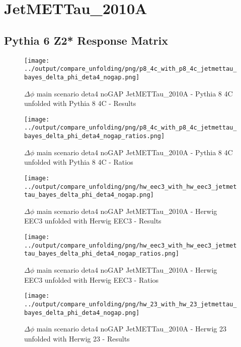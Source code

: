 \documentclass[11pt]{book}
\begin{document}
\section{JetMETTau\_2010A}
\subsection{Pythia 6 Z2* Response Matrix}


\begin{figure}[ht]
\centering
\texttt{[image: ../output/compare\_unfolding/png/p8\_4c\_with\_p8\_4c\_jetmettau\_bayes\_delta\_phi\_deta4\_nogap.png]}
\caption{$\Delta\phi$ main scenario deta4 noGAP JetMETTau\_2010A - Pythia 8 4C unfolded with Pythia 8 4C - Results}
\label{p8_p8_jetmettau_bayes_delta_phi_deta4_nogap_a}
\end{figure}

\begin{figure}[ht]
\centering
\texttt{[image: ../output/compare\_unfolding/png/p8\_4c\_with\_p8\_4c\_jetmettau\_bayes\_delta\_phi\_deta4\_nogap\_ratios.png]}
\caption{$\Delta\phi$ main scenario deta4 noGAP JetMETTau\_2010A - Pythia 8 4C unfolded with Pythia 8 4C - Ratios}
\label{p8_p8_jetmettau_bayes_delta_phi_deta4_nogap_b}
\end{figure}

\begin{figure}[ht]
\centering
\texttt{[image: ../output/compare\_unfolding/png/hw\_eec3\_with\_hw\_eec3\_jetmettau\_bayes\_delta\_phi\_deta4\_nogap.png]}
\caption{$\Delta\phi$ main scenario deta4 noGAP JetMETTau\_2010A - Herwig EEC3 unfolded with Herwig EEC3 - Results}
\label{hw_eec3_hw_eec3_jetmettau_bayes_delta_phi_deta4_nogap_a}
\end{figure}

\begin{figure}[ht]
\centering
\texttt{[image: ../output/compare\_unfolding/png/hw\_eec3\_with\_hw\_eec3\_jetmettau\_bayes\_delta\_phi\_deta4\_nogap\_ratios.png]}
\caption{$\Delta\phi$ main scenario deta4 noGAP JetMETTau\_2010A - Herwig EEC3 unfolded with Herwig EEC3 - Ratios}
\label{hw_eec3_hw_eec3_jetmettau_bayes_delta_phi_deta4_nogap_b}
\end{figure}

\begin{figure}[ht]
\centering
\texttt{[image: ../output/compare\_unfolding/png/hw\_23\_with\_hw\_23\_jetmettau\_bayes\_delta\_phi\_deta4\_nogap.png]}
\caption{$\Delta\phi$ main scenario deta4 noGAP JetMETTau\_2010A - Herwig 23 unfolded with Herwig 23 - Results}
\label{hw_23_hw_23_jetmettau_bayes_delta_phi_deta4_nogap_a}
\end{figure}
\end{document}
